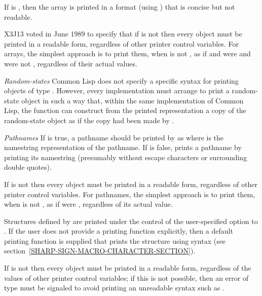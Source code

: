 \begin{flushdesc}
\begin{obsolete}
If  is {\false}, then the array is printed
in a format (using \cd{\#<}) that is concise but not readable.
\end{obsolete}
\begin{newer}
X3J13 voted in June 1989  to specify that if 
is not {\false} then every object must be printed in a readable form,
regardless of other printer control variables.  For arrays, the simplest approach
is to print them, when  is not {\false}, as if 
and  were {\false} and  were not {\false},
regardless of their actual values.
\end{newer}

\item[\emph{Random-states}]
Common Lisp does not specify a specific syntax
for printing objects of type .  However, every implementation
must arrange to print a random-state object in such a way that,
within the same implementation of Common Lisp, the function 
can construct from the printed representation a copy of the random-state
object as if the copy had been made by .

\item[\emph{Pathnames}]
If  is true, a pathname
should be printed by  as  where  is the
namestring representation of the pathname.  If 
is false,  prints a pathname by printing its namestring
(presumably without escape characters or surrounding double quotes).

If 
is not {\false} then every object must be printed in a readable form,
regardless of other printer control variables.  For pathnames, the simplest approach
is to print them, when  is not {\false}, as if 
were {\false},
regardless of its actual value.
\end{flushdesc}

Structures defined by  are printed under the
control of the user-specified  option to .
If the user does not provide a printing function explicitly,
then a default printing function is supplied that prints the structure
using  syntax (see section~\ref{SHARP-SIGN-MACRO-CHARACTER-SECTION}).

If 
is not {\false} then every object must be printed in a readable form,
regardless of the values of other printer control variables; if this is not possible,
then an error of type  must be signaled to avoid
printing an unreadable syntax such as .

